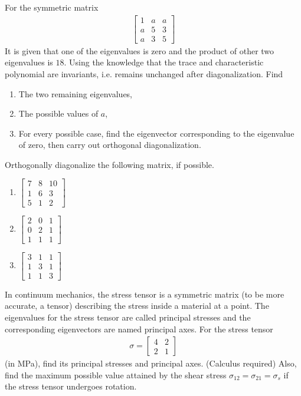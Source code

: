 \begin{Exercise}
For the symmetric matrix 
\begin{align*}
\begin{bmatrix}
1 & a & a\\
a & 5 & 3\\
a & 3 & 5
\end{bmatrix}
\end{align*}
It is given that one of the eigenvalues is zero and the product of other two eigenvalues is $18$. Using the knowledge that the trace and characteristic polynomial are invariants, i.e. remains unchanged after diagonalization. Find 
\begin{enumerate}[label=(\alph*)]
\item The two remaining eigenvalues,
\item The possible values of $a$,
\item For every possible case, find the eigenvector corresponding to the eigenvalue of zero, then carry out orthogonal diagonalization.
\end{enumerate}
\end{Exercise}

\begin{Exercise}
Orthogonally diagonalize the following matrix, if possible.
\begin{enumerate}[label=(\alph*)]
\item $\begin{bmatrix}
7 & 8 & 10\\
1 & 6 & 3\\
5 & 1 & 2
\end{bmatrix}$
\item $\begin{bmatrix}
2 & 0 & 1\\
0 & 2 & 1\\
1 & 1 & 1
\end{bmatrix}$
\item $\begin{bmatrix}
3 & 1 & 1\\
1 & 3 & 1\\
1 & 1 & 3
\end{bmatrix}$
\end{enumerate}
\end{Exercise}

\begin{Exercise}
In continuum mechanics, the stress tensor is a symmetric matrix (to be more accurate, a tensor) describing the stress inside a material at a point. The eigenvalues for the stress tensor are called principal stresses and the corresponding eigenvectors are named principal axes. For the stress tensor
\begin{align*}
\sigma = 
\begin{bmatrix}
4 & 2\\
2 & 1
\end{bmatrix}
\end{align*}
(in MPa), find its principal stresses and principal axes. (Calculus required) Also, find the maximum possible value attained by the shear stress $\sigma_{12} = \sigma_{21} = \sigma_{s}$ if the stress tensor undergoes rotation.
\end{Exercise}

